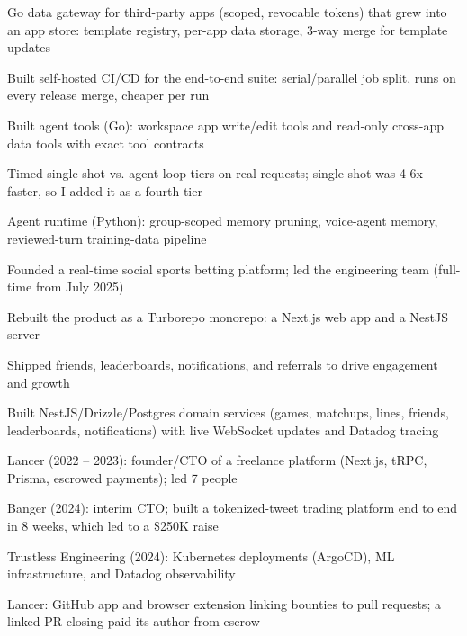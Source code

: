 \documentclass[print]{jack-resume}
\begin{document}
\begin{tightemize}
    \item Go data gateway for third-party apps (scoped, revocable tokens) that grew into an app store: template registry, per-app data storage, 3-way merge for template updates
    \item Built self-hosted CI/CD for the end-to-end suite: serial/parallel job split, runs on every release merge, cheaper per run
    \item Built agent tools (Go): workspace app write/edit tools and read-only cross-app data tools with exact tool contracts
    \item Timed single-shot vs. agent-loop tiers on real requests; single-shot was 4-6x faster, so I added it as a fourth tier
    \item Agent runtime (Python): group-scoped memory pruning, voice-agent memory, reviewed-turn training-data pipeline
\end{tightemize}
\sectionsep

\begin{tightemize}
    \item Founded a real-time social sports betting platform; led the engineering team (full-time from July 2025)
    \item Rebuilt the product as a Turborepo monorepo: a Next.js web app and a NestJS server
    \item Shipped friends, leaderboards, notifications, and referrals to drive engagement and growth
    \item Built NestJS/Drizzle/Postgres domain services (games, matchups, lines, friends, leaderboards, notifications) with live WebSocket updates and Datadog tracing
\end{tightemize}
\sectionsep

\begin{tightemize}
    \item Lancer (2022 -- 2023): founder/CTO of a freelance platform (Next.js, tRPC, Prisma, escrowed payments); led 7 people
    \item Banger (2024): interim CTO; built a tokenized-tweet trading platform end to end in 8 weeks, which led to a \$250K raise
    \item Trustless Engineering (2024): Kubernetes deployments (ArgoCD), ML infrastructure, and Datadog observability
    \item Lancer: GitHub app and browser extension linking bounties to pull requests; a linked PR closing paid its author from escrow
\end{tightemize}
\sectionsep
\end{document}
